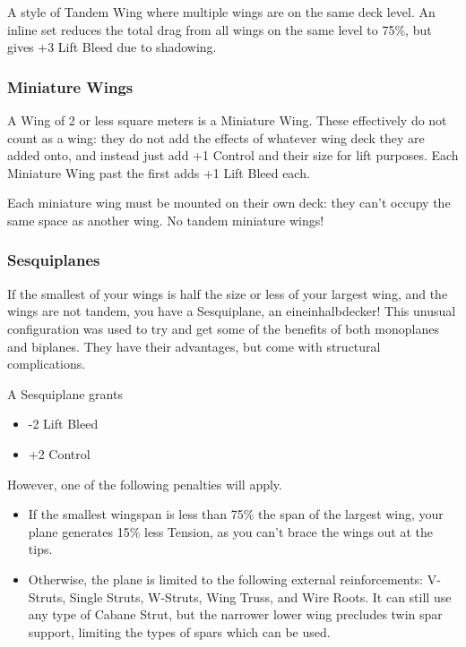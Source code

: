 \documentclass{article}
\begin{document}
A style of Tandem Wing where multiple wings are on the same deck level.
An inline set reduces the total drag from all wings on the same level to
75\%, but gives +3 Lift Bleed due to shadowing.

\subsubsection{Miniature Wings}
\label{_Miniature Wings}

A Wing of 2 or less square meters is a Miniature Wing. These effectively
do not count as a wing: they do not add the effects of whatever wing
deck they are added onto, and instead just add +1 Control and their size
for lift purposes. Each Miniature Wing past the first adds +1 Lift Bleed
each.

Each miniature wing must be mounted on their own deck: they can't occupy
the same space as another wing. No tandem miniature wings!

\subsubsection{Sesquiplanes}
\label{_Sesquiplanes}

If the smallest of your wings is half the size or less of your largest
wing, and the wings are not tandem, you have a Sesquiplane, an
eineinhalbdecker! This unusual configuration was used to try and get
some of the benefits of both monoplanes and biplanes. They have their
advantages, but come with structural complications.

A Sesquiplane grants

\begin{itemize}
    \item          -2 Lift Bleed
    \item          +2 Control
\end{itemize}

However, one of the following penalties will apply.

\begin{itemize}
    \item          If the smallest wingspan is less than 75\% the span of the
          largest wing, your plane generates 15\% less Tension, as you can't
          brace the wings out at the tips.
    \item          Otherwise, the plane is limited to the following external
          reinforcements: V-Struts, Single Struts, W-Struts, Wing Truss, and
          Wire Roots. It can still use any type of Cabane Strut, but the
          narrower lower wing precludes twin spar support, limiting the types of
          spars which can be used.
\end{itemize}
\end{document}
